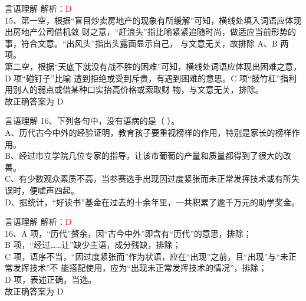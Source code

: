 \documentclass[aspectratio=169]{beamer}
\begin{document}
\begin{frame}[t]{言语理解}
    解析：\textcolor{red}{D}\\
    15、第一空，根据“盲目炒卖房地产的现象有所缓解”可知，横线处填入词语应体现出房地产公司借机敛
财之意，“赶浪头”指比喻紧紧追随时尚，做适应当前形势的事，符合文意。“出风头”指出头露面显示自己，
与文意无关，故排除 A、B 两项。\\
第二空，根据“天底下就没有战不胜的困难”可知，横线处词语应体现出困难之意，D 项“碰钉子”比喻
遭到拒绝或受到斥责，有遇到困难的意思。C 项“敲竹杠”指利用别人的弱点或借某种口实抬高价格或索取财
物，与文意无关，排除。\\
故正确答案为 D\\
\end{frame}



\begin{frame}[t]{言语理解}
16、下列各句中，没有语病的是（ ）。\\
A、历代古今中外的经验证明，教育孩子要重视榜样的作用，特别是家长的榜样作用。\\
B、经过市立学院几位专家的指导，让该市葡萄的产量和质量都得到了很大的改善。\\
C、有少数观众素质不高，当参赛选手出现因过度紧张而未正常发挥技术或有所失误时，便嘘声四起。\\
D、据统计，“好读书”基金在过去的十余年里，一共积累了逾千万元的助学奖金。\\
\end{frame}

\begin{frame}[t]{言语理解}
    解析：\textcolor{red}{D}\\
    16、A 项，“历代”赘余，因“古今中外”即含有“历代”的意思，排除；\\
    B 项，“经过……让”缺少主语，成分残缺，排除；\\
    C 项，语序不当，“因过度紧张而”作为状语，应在“出现”之前，且“出现”与“未正常发挥技术”不
    能搭配使用，应为“出现未正常发挥技术的情况”，排除；\\
    D 项，表述正确，当选。\\
    故正确答案为 D\\
\end{frame}
\end{document}
